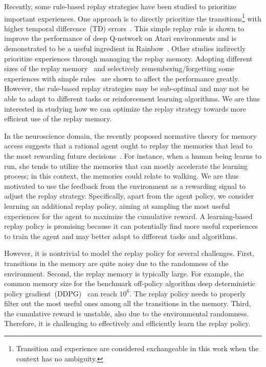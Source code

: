 \documentclass{article}
\begin{document}
Recently, some rule-based replay strategies have been studied to prioritize important experiences. One approach is to directly prioritize the transitions\footnote{Transition and experience are considered exchangeable in this work when the context has no ambiguity.} with higher temporal difference~(TD) errors~\cite{schaul2016prioritized}. This simple replay rule is shown to improve the performance of deep Q-network on Atari environments and is demonstrated to be a useful ingredient in Rainbow~\cite{hessel2018rainbow}. Other studies indirectly prioritize experiences through managing the replay memory. Adopting different sizes of the replay memory~\cite{zhang2017deeper,liu2017effects} and selectively remembering/forgetting some experiences with simple rules~\cite{novati2018remember} are shown to affect the performance greatly. However, the rule-based replay strategies may be sub-optimal and may not be able to adapt to different tasks or reinforcement learning algorithms. We are thus interested in studying how we can optimize the replay strategy towards more efficient use of the replay memory.

In the neuroscience domain, the recently proposed normative theory for memory access suggests that a rational agent ought to replay the memories that lead to the most rewarding future decisions~\cite{mattar2018prioritized}. For instance, when a human being learns to run, she tends to utilize the memories that can mostly accelerate the learning process; in this context, the memories could relate to walking. We are thus motivated to use the feedback from the environment as a rewarding signal to adjust the replay strategy. Specifically, apart from the agent policy, we consider learning an additional replay policy, aiming at sampling the most useful experiences for the agent to maximize the cumulative reward. A learning-based replay policy is promising because it can potentially find more useful experiences to train the agent and may better adapt to different tasks and algorithms.

However, it is nontrivial to model the replay policy for several challenges. First, transitions in the memory are quite noisy due to the randomness of the environment. Second, the replay memory is typically large. For example, the common memory size for the benchmark off-policy algorithm deep deterministic policy gradient~(DDPG)~\cite{lillicrap2016continuous} can reach $10^6$. The replay policy needs to properly filter out the most useful ones among all the transitions in the memory.  Third, the cumulative reward is unstable, also due to the environmental randomness. Therefore, it is challenging to effectively and efficiently learn the replay policy.
\end{document}
